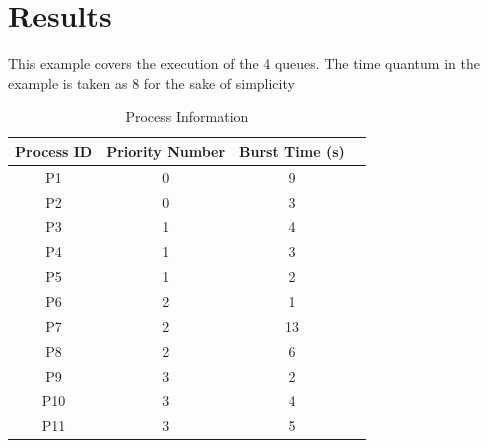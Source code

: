 \documentclass{article}
\begin{document}
\section{Results}
This example covers the execution of the 4 queues. The time quantum in the example is taken as 8 for the sake of simplicity
\begin{table}[htbp]
  \centering
  \begin{tabular}{|c|c|c|c|}
      \hline
      \textbf{Process ID} & \textbf{Priority Number} & \textbf{Burst Time (s)} \\
      \hline
      P1 & 0 & 9 \\
      P2 & 0 & 3 \\
      P3 & 1 & 4 \\
      P4 & 1 & 3 \\
      P5 & 1 & 2 \\
      P6 & 2 & 1 \\
      P7 & 2 & 13 \\
      P8 & 2 & 6 \\
      P9 & 3 & 2 \\
      P10 & 3 & 4 \\
      P11 & 3 & 5 \\
      \hline
  \end{tabular}
  \caption{Process Information}
  \label{tab:process_info}
\end{table}
\end{document}
